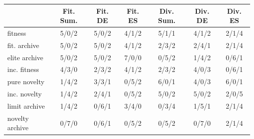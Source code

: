\begin{tabular}{l|ccc|ccc}
\toprule
{} & Fit. Sum. & Fit. DE & Fit. ES & Div. Sum. & Div. DE & Div. ES \\
\midrule
fitness         &     5/0/2 &   5/0/2 &   4/1/2 &     5/1/1 &   4/1/2 &   2/1/4 \\
fit. archive    &     5/0/2 &   5/0/2 &   4/1/2 &     2/3/2 &   2/4/1 &   2/1/4 \\
elite archive   &     5/0/2 &   5/0/2 &   7/0/0 &     0/5/2 &   1/4/2 &   0/6/1 \\
inc. fitness    &     4/3/0 &   2/3/2 &   4/1/2 &     2/3/2 &   4/0/3 &   0/6/1 \\
pure novelty    &     1/4/2 &   3/3/1 &   0/5/2 &     6/0/1 &   4/0/3 &   6/0/1 \\
inc. novelty    &     1/4/2 &   2/4/1 &   0/5/2 &     5/0/2 &   5/0/2 &   2/0/5 \\
limit archive   &     1/4/2 &   0/6/1 &   3/4/0 &     0/3/4 &   1/5/1 &   2/1/4 \\
novelty archive &     0/7/0 &   0/6/1 &   0/5/2 &     0/5/2 &   0/7/0 &   2/1/4 \\
\bottomrule
\end{tabular}
